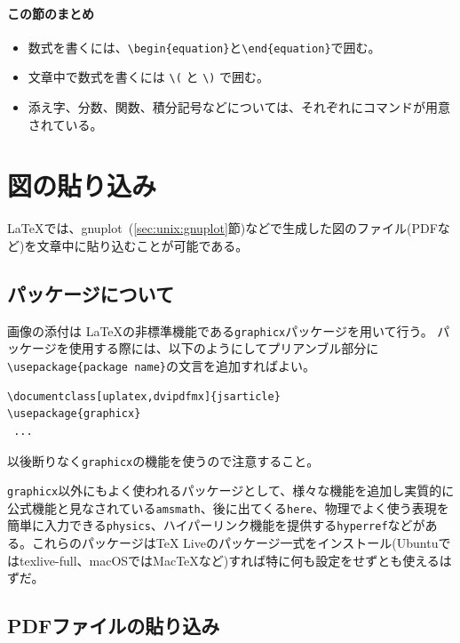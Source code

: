 \paragraph{この節のまとめ}

\begin{itemize}
    \item 数式を書くには、\verb|\begin{equation}|と\verb|\end{equation}|で囲む。
    \item 文章中で数式を書くには \texttt{\textbackslash(} と \texttt{\textbackslash)} で囲む。
    \item 添え字、分数、関数、積分記号などについては、それぞれにコマンドが用意されている。
\end{itemize}

\section{図の貼り込み}
\label{sec:latex:picture}

\LaTeX では、gnuplot~(\ref{sec:unix:gnuplot}節)などで生成した図のファイル(PDFなど)を文章中に貼り込むことが可能である。

\subsection{パッケージについて}
\label{sec:latex:package}
画像の添付は \LaTeX の非標準機能である\texttt{graphicx}パッケージを用いて行う。
パッケージを使用する際には、以下のようにしてプリアンブル部分に\texttt{\textbackslash usepackage\{package name\}}の文言を追加すればよい。
\begin{reidai}
    \label{reidai:latex:package}
    \begin{verbatim}
\documentclass[uplatex,dvipdfmx]{jsarticle}
\usepackage{graphicx}
 ...
\end{verbatim}
\end{reidai} \noindent
以後断りなく\texttt{graphicx}の機能を使うので注意すること。

\texttt{graphicx}以外にもよく使われるパッケージとして、様々な機能を追加し実質的に公式機能と見なされている\texttt{amsmath}、後に出てくる\texttt{here}、物理でよく使う表現を簡単に入力できる\texttt{physics}、ハイパーリンク機能を提供する\texttt{hyperref}などがある。これらのパッケージはTeX Liveのパッケージ一式をインストール(Ubuntuではtexlive-full、macOSではMacTeXなど)すれば特に何も設定をせずとも使えるはずだ。

\subsection{PDFファイルの貼り込み}
\label{sec:latex:include_pdf}

